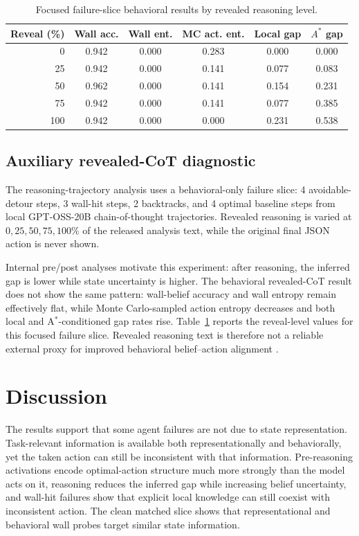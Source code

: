 \documentclass[10pt,twocolumn]{article}
\begin{document}
\begin{table}[t]
\centering
\scriptsize
\setlength{\tabcolsep}{3.5pt}
\begin{tabular}{rccccc}
\toprule
\textbf{Reveal (\%)} & \textbf{Wall acc.} & \textbf{Wall ent.} & \textbf{MC act. ent.} & \textbf{Local gap} & \textbf{$A^\ast$ gap} \\
\midrule
0   & 0.942 & 0.000 & 0.283 & 0.000 & 0.000 \\
25  & 0.942 & 0.000 & 0.141 & 0.077 & 0.083 \\
50  & 0.962 & 0.000 & 0.141 & 0.154 & 0.231 \\
75  & 0.942 & 0.000 & 0.141 & 0.077 & 0.385 \\
100 & 0.942 & 0.000 & 0.000 & 0.231 & 0.538 \\
\bottomrule
\end{tabular}
\caption{Focused failure-slice behavioral results by revealed reasoning level.}\label{tab:focused_failure_slice}
\end{table}


\subsection{Auxiliary revealed-CoT diagnostic}
The reasoning-trajectory analysis uses a behavioral-only failure slice: 4 avoidable-detour steps, 3 wall-hit steps, 2 backtracks, and 4 optimal baseline steps from local GPT-OSS-20B chain-of-thought trajectories. Revealed reasoning is varied at $0,25,50,75,100\%$ of the released analysis text, while the original final JSON action is never shown.

Internal pre/post analyses motivate this experiment: after reasoning, the inferred gap is lower while state uncertainty is higher. The behavioral revealed-CoT result does not show the same pattern: wall-belief accuracy and wall entropy remain effectively flat, while Monte Carlo-sampled action entropy decreases and both local and A$^\ast$-conditioned gap rates rise. Table~\ref{tab:focused_failure_slice} reports the reveal-level values for this focused failure slice. Revealed reasoning text is therefore not a reliable external proxy for improved behavioral belief--action alignment \cite{lanham2023measuring, li2025spilling, marks2025auditing}.



\section{Discussion}
The results support that some agent failures are not due to state representation. Task-relevant information is available both representationally and behaviorally, yet the taken action can still be inconsistent with that information. Pre-reasoning activations encode optimal-action structure much more strongly than the model acts on it, reasoning reduces the inferred gap while increasing belief uncertainty, and wall-hit failures show that explicit local knowledge can still coexist with inconsistent action. The clean matched slice shows that representational and behavioral wall probes target similar state information.
\end{document}
